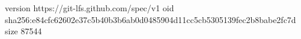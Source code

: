 version https://git-lfs.github.com/spec/v1
oid sha256:e84cfc62602e37c5b40b3b6ab0d0485904d11cc5cb5305139fec2b8babe2fc7d
size 87544
